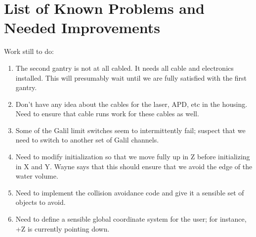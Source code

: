 \documentclass[a4paper,12pt]{article}
\begin{document}
\section{List of Known Problems and Needed Improvements}

Work still to do:

\begin{enumerate}
\item The second gantry is not at all cabled.  It needs all cable and electronics installed.  This will presumably wait
until we are fully satisfied with the first gantry.

\item Don't have any idea about the cables for the laser, APD, etc in the housing.  Need to ensure that cable runs
 work for these cables as well.

\item Some of the Galil limit switches seem to intermittently fail; suspect that we need to switch to another set of Galil
channels.

\item Need to modify initialization so that we move fully up in Z before initializing in X and Y.   Wayne says that this
should ensure that we avoid the edge of the water volume.

\item Need to implement the collision avoidance code and give it a sensible set of objects to avoid.

\item Need to define a sensible global coordinate system for the user; for instance, +Z is currently pointing 
down.
\end{enumerate}
\end{document}

